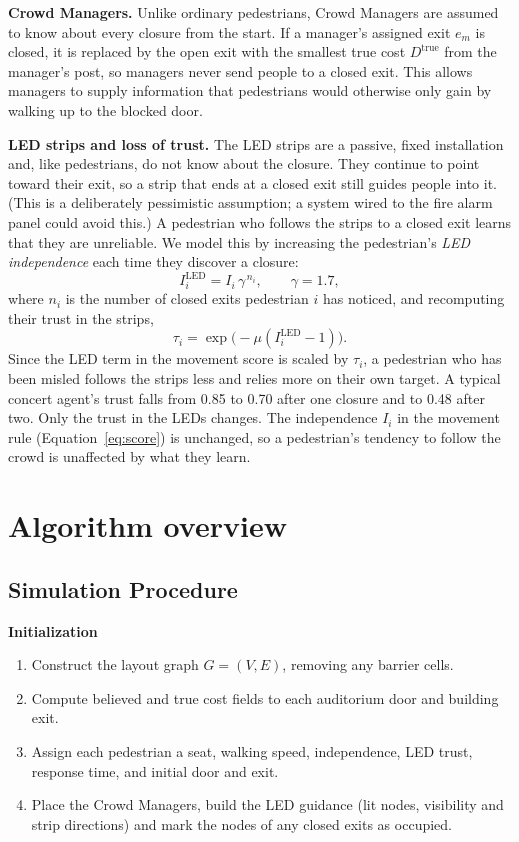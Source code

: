 \documentclass{article}
\begin{document}
\textbf{Crowd Managers.}
Unlike ordinary pedestrians, Crowd Managers are assumed to know about every
closure from the start. If a manager's assigned exit $e_m$ is closed, it is
replaced by the open exit with the smallest true cost $D^{\mathrm{true}}$ from the
manager's post, so managers never send people to a closed exit. This allows
managers to supply information that pedestrians would
otherwise only gain by walking up to the blocked door.

\textbf{LED strips and loss of trust.}
The LED strips are a passive, fixed installation and, like pedestrians, do not
know about the closure. They continue to point toward their exit, so a strip that ends at a closed exit still guides people into it.
(This is a deliberately pessimistic assumption; a system wired to the fire alarm panel could
avoid this.) A pedestrian who follows the strips to a closed exit
learns that they are unreliable. We model this by increasing the pedestrian's
\emph{LED independence} each time they discover a closure:
\begin{equation}
    I_i^{\mathrm{LED}} = I_i \,\gamma^{\,n_i}, \qquad \gamma = 1.7 ,
\end{equation}
where $n_i$ is the number of closed exits pedestrian $i$ has noticed, and recomputing their trust in the strips,
\begin{equation}
    \tau_i = \exp\!\big(-\mu (I_i^{\mathrm{LED}} - 1)\big).
\end{equation}
Since the LED term in the movement score is scaled by $\tau_i$, a pedestrian
who has been misled follows the strips less and relies more on their
own target. A typical concert agent's trust falls from 0.85 to 0.70 after one closure and to 0.48 after two. Only the trust in the LEDs changes. The independence $I_i$ in the
movement rule (Equation~\ref{eq:score}) is unchanged, so a pedestrian's tendency to
follow the crowd is unaffected by what they learn.

\newpage
\section{Algorithm overview}
\subsection{Simulation Procedure}
\textbf{Initialization}

\begin{enumerate}
    \item Construct the layout graph $G=(V,E)$, removing any barrier cells.

    \item Compute believed and true cost fields to each
    auditorium door and building exit.

    \item Assign each pedestrian a seat, walking speed,
    independence, LED trust, response time, and initial door and exit.

    \item Place the Crowd Managers, build the LED guidance (lit nodes, visibility and strip directions) and mark the nodes of any closed exits as occupied.
\end{enumerate}
\end{document}
